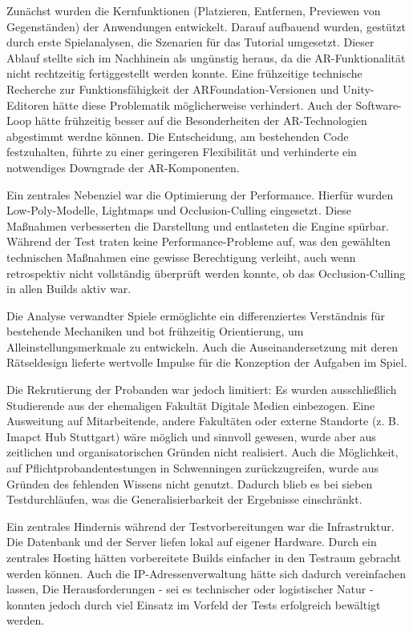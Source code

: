 Zunächst wurden die Kernfunktionen (Platzieren, Entfernen, Previewen von Gegenständen) der Anwendungen entwickelt. Darauf aufbauend wurden, gestützt durch erste Spielanalysen, die Szenarien für das Tutorial umgesetzt. Dieser Ablauf stellte sich im Nachhinein als ungünstig heraus, da die \ac{AR}-Funktionalität nicht rechtzeitig fertiggestellt werden konnte. Eine frühzeitige technische Recherche zur Funktionsfähigkeit der ARFoundation-Versionen und Unity-Editoren hätte diese Problematik möglicherweise verhindert. Auch der Software-Loop hätte frühzeitig besser auf die Besonderheiten der \ac{AR}-Technologien abgestimmt werdne können. Die Entscheidung, am bestehenden Code festzuhalten, führte zu einer geringeren Flexibilität und verhinderte ein notwendiges Downgrade der \ac{AR}-Komponenten.

Ein zentrales Nebenziel war die Optimierung der Performance. Hierfür wurden Low-Poly-Modelle, Lightmaps und Occlusion-Culling eingesetzt. Diese Maßnahmen verbesserten die Darstellung und entlasteten die Engine spürbar. Während der Test traten keine Performance-Probleme auf, was den gewählten technischen Maßnahmen eine gewisse Berechtigung verleiht, auch wenn retrospektiv nicht vollständig überprüft werden konnte, ob das Occlusion-Culling in allen Builds aktiv war.

Die Analyse verwandter Spiele ermöglichte ein differenziertes Verständnis für bestehende Mechaniken und bot frühzeitig Orientierung, um Alleinstellungsmerkmale zu entwickeln. Auch die Auseinandersetzung mit deren Rätseldesign lieferte wertvolle Impulse für die Konzeption der Aufgaben im Spiel.

Die Rekrutierung der Probanden war jedoch limitiert: Es wurden ausschließlich Studierende aus der ehemaligen Fakultät Digitale Medien einbezogen. Eine Ausweitung auf Mitarbeitende, andere Fakultäten oder externe Standorte (z. B. Imapct Hub Stuttgart) wäre möglich und sinnvoll gewesen, wurde aber aus zeitlichen und organisatorischen Gründen nicht realisiert. Auch die Möglichkeit, auf Pflichtprobandentestungen in Schwenningen zurückzugreifen, wurde aus Gründen des fehlenden Wissens nicht genutzt. Dadurch blieb es bei sieben Testdurchläufen, was die Generalisierbarkeit der Ergebnisse einschränkt.

Ein zentrales Hindernis während der Testvorbereitungen war die Infrastruktur. Die Datenbank und der Server liefen lokal auf eigener Hardware. Durch ein zentrales Hosting hätten vorbereitete Builds einfacher in den Testraum gebracht werden können. Auch die IP-Adressenverwaltung hätte sich dadurch vereinfachen lassen, Die Herausforderungen - sei es technischer oder logistischer Natur - konnten jedoch durch viel Einsatz im Vorfeld der Tests erfolgreich bewältigt werden.

